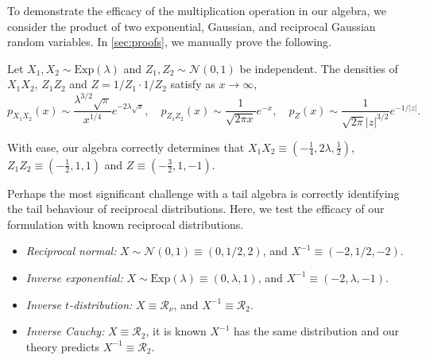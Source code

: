 \documentclass[../thesis.tex]{subfiles}
\begin{document}
\begin{example}
  To demonstrate the efficacy of the multiplication operation in our algebra, we consider the product of two exponential, Gaussian, and reciprocal Gaussian random variables. In \cref{sec:proofs}, we manually prove the following.
  \begin{lemma}
    \label{lem:Products}
    Let $X_1,X_2 \sim \mbox{Exp}(\lambda)$ and $Z_1,Z_2 \sim \mathcal{N}(0,1)$ be independent. The densities of $X_1 X_2$, $Z_1 Z_2$ and $Z = 1/Z_1 \cdot 1/Z_2$ satisfy as $x \to \infty$,
    \[
      p_{X_1 X_2}(x) \sim \frac{\lambda^{3/2}\sqrt{\pi}}{x^{1/4}} e^{-2\lambda \sqrt{x}},\quad p_{Z_1 Z_2}(x) \sim \frac{1}{\sqrt{2\pi x}} e^{-x},\quad
      p_{Z}(x) \sim \frac{1}{\sqrt{2\pi}|z|^{3/2}}e^{-1/|z|}.
    \]
  \end{lemma}
  With ease, our algebra correctly determines that $X_1 X_2 \equiv (-\frac14,2\lambda,\frac12)$, $Z_1 Z_2 \equiv (-\frac12, 1, 1)$ and $Z \equiv (-\frac32,1,-1)$.
\end{example}


\begin{example}
  Perhaps the most significant challenge with a tail algebra is correctly identifying the tail behaviour of reciprocal distributions. Here, we test the efficacy of our formulation with known reciprocal distributions.
  \begin{itemize}
    \item \emph{Reciprocal normal:} $X \sim \mathcal{N}(0,1) \equiv (0,1/2,2)$, and $X^{-1} \equiv (-2,1/2,-2)$.
    \item \emph{Inverse exponential:} $X \sim \text{Exp}(\lambda) \equiv (0,\lambda,1)$, and $X^{-1} \equiv (-2,\lambda,-1)$.
    \item \emph{Inverse $t$-distribution:} $X \equiv \mathcal{R}_\nu$, and $X^{-1} \equiv \mathcal{R}_2$.
    \item \emph{Inverse Cauchy:} $X \equiv \mathcal{R}_2$, it is known $X^{-1}$
          has the same distribution and our theory predicts $X^{-1} \equiv \mathcal{R}_2$.
  \end{itemize}
\end{example}
\end{document}
